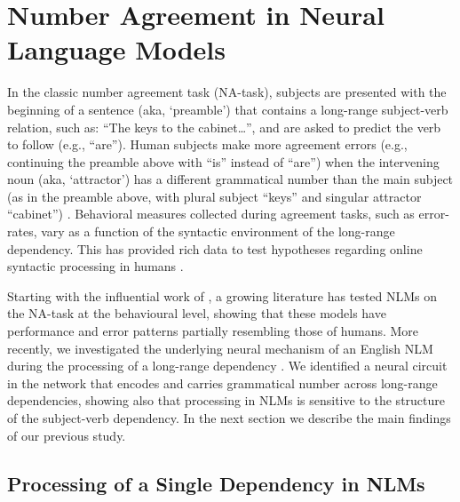 \section{Number Agreement in Neural Language Models}
In the classic number agreement task (NA-task), subjects are presented with the beginning of a sentence (aka, `preamble') that contains a long-range subject-verb relation, such as: ``The keys to the cabinet\ldots'', and are asked to predict the verb to follow (e.g., ``are''). Human subjects make more agreement errors (e.g., continuing the preamble  above with ``is'' instead of ``are'') when the intervening noun (aka, `attractor') has a different grammatical number than the main subject (as in the preamble above, with plural subject ``keys'' and singular attractor ``cabinet'') . Behavioral measures collected during agreement tasks, such as error-rates, vary as a function of the syntactic environment of the long-range dependency. This has provided rich data to test hypotheses regarding online syntactic processing in humans \citep[e.g., ][]{franck2002subject, franck2006agreement, franck2007syntactic}.

Starting with the influential work of \citet{Linzen:etal:2016}, a growing
literature \citep[e.g.,][]{Gulordava:etal:2018, Bernardy:Lappin:2017,
  Giulianelli:etal:2018, Kuncoro:etal:2018a,Linzen:Leonard:2018,jumelet2019analysing} has
tested NLMs on the NA-task at the behavioural level, showing that these models have performance
and error patterns partially resembling those of humans. %
More recently, we investigated the underlying neural mechanism of an
English NLM during the processing of a long-range dependency
\citep{lakretz2019emergence}. We identified a neural circuit in the
network that encodes and carries grammatical number across long-range
dependencies, showing also that processing in NLMs is sensitive to the
structure of the subject-verb dependency. In the next section we
describe the main findings of our previous study.

\subsection{Processing of a Single Dependency in NLMs}
